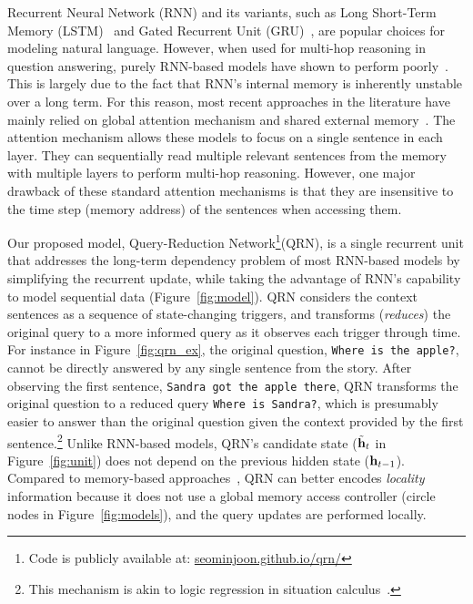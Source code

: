 \documentclass[table]{article}
\begin{document}
Recurrent Neural Network (RNN) and its variants, such as Long Short-Term Memory (LSTM)~\citep{lstm} and Gated Recurrent Unit (GRU)~\citep{GRU}, are popular choices for modeling natural language. However, when used for multi-hop reasoning in question answering, purely RNN-based models have shown to perform poorly~\citep{babi}. This is largely due to the fact that RNN's internal memory is inherently unstable over a long term. For this reason, most recent approaches in the literature have mainly relied on global attention mechanism and shared external memory~\citep{memN2N,NR,DMN+,graves2016hybrid}.
The attention mechanism allows these models to focus on a single sentence in each layer.
They can sequentially read multiple relevant sentences from the memory with multiple layers to perform multi-hop reasoning. However, one major drawback of these standard attention mechanisms is that they are insensitive to the time step (memory address) of the sentences when accessing them.


Our proposed model, Query-Reduction Network\footnote{Code is publicly available at: \url{seominjoon.github.io/qrn/}}(QRN), is a single recurrent unit that addresses the long-term dependency problem of most RNN-based models by simplifying the recurrent update, while taking the advantage of RNN's capability to model sequential data (Figure~\ref{fig:model}).
QRN considers the context sentences as a sequence of state-changing triggers, and transforms (\emph{reduces}) the original query to a more informed query as it observes each trigger through time. 
For instance in Figure~\ref{fig:qrn_ex}, 
the original question, \texttt{Where is the apple?}, cannot be directly answered by any single sentence from the story. After observing the first sentence, \texttt{Sandra got the apple there}, QRN transforms the original question to a reduced query \texttt{Where is Sandra?}, which is presumably easier to answer than the original question given the context provided by the first sentence.\footnote{This mechanism is akin to logic regression in situation calculus~\citep{reiter}.}
Unlike RNN-based models, QRN's candidate state ($\tilde{\bf h}_t$ in Figure~\ref{fig:unit}) does not depend on the previous hidden state (${\bf h}_{t-1}$). 
Compared to memory-based approaches~\citep{memNet,memN2N,NR,DMN,DMN+}, QRN can better encodes \emph{locality} information because  it does not use a global memory access controller (circle nodes in Figure~\ref{fig:models}), and the query updates are performed locally.
\end{document}

